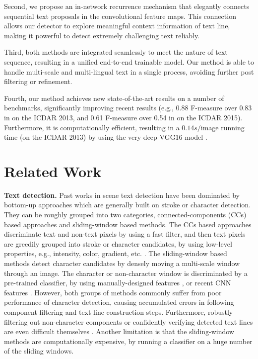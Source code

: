 \documentclass[runningheads]{llncs}
\begin{document}
Second, we propose an in-network recurrence mechanism that elegantly connects sequential text proposals  in the convolutional feature maps. This connection allows our detector to explore meaningful context information of text line, making it powerful to detect  extremely challenging text reliably.


Third, both methods are integrated seamlessly to meet the nature of text sequence, resulting in a unified end-to-end trainable model. Our method is able to handle multi-scale and multi-lingual text in a single process, avoiding further post filtering or refinement. 

Fourth, our method achieves new state-of-the-art results on a number of benchmarks, significantly improving recent results (e.g., 0.88 F-measure over 0.83 in \cite{Gupta2016} on the ICDAR 2013, and 0.61 F-measure over 0.54 in \cite{Zhang2016} on the ICDAR 2015). Furthermore,  it is computationally efficient, resulting in a $0.14s/$image running time (on the ICDAR 2013) by using the very deep VGG16 model \cite{Simonyan2015}.

\section{Related Work}
\textbf{Text detection.}  Past works in scene text detection have been dominated by bottom-up approaches which are generally built on stroke or character detection. They can be roughly grouped into two categories, connected-components (CCs) based approaches and sliding-window based methods.  The CCs based approaches discriminate text and non-text pixels by using a fast filter, and then text pixels are greedily grouped into stroke or character candidates, by using  low-level properties, e.g., intensity, color, gradient, etc. \cite{Yin2014,Huang2014,Yin2015,Huang2013,Epshtein2010}.  The sliding-window based methods detect character candidates by densely moving a multi-scale window through an image. The character or non-character window is discriminated by a pre-trained classifier, by using manually-designed features \cite{Tian2015,Wang2011},  or recent CNN features \cite{Jaderberg2014}.  However, both groups of methods commonly suffer from poor performance of character detection, causing accumulated errors in following component filtering and text line construction steps. Furthermore, robustly filtering out non-character components or confidently verifying detected text lines are even difficult themselves \cite{Busta2015,Yin2014,Huang2014}. Another limitation is that the sliding-window methods  are computationally expensive, by running a classifier on a huge number of the sliding windows. 
\end{document}
